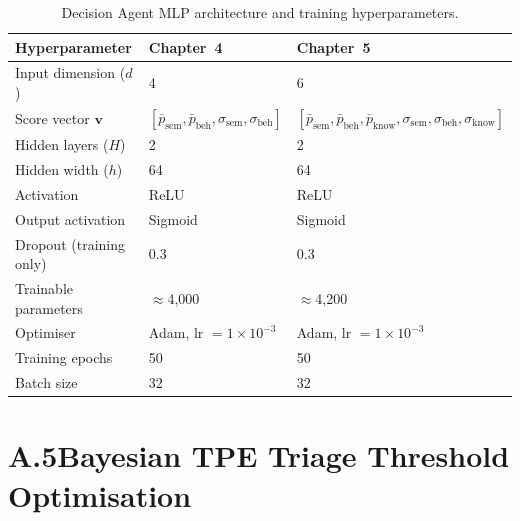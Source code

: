 \begin{table}[ht]
\centering
\caption{Decision Agent MLP architecture and training hyperparameters.}
\label{tab:app_mlp}
\begin{tabular}{@{}lll@{}}
\toprule
\textbf{Hyperparameter} & \textbf{Chapter~4} & \textbf{Chapter~5} \\
\midrule
Input dimension ($d$)         & 4  & 6  \\
Score vector $\mathbf{v}$     & $[\bar{p}_{\mathrm{sem}},\bar{p}_{\mathrm{beh}},\sigma_{\mathrm{sem}},\sigma_{\mathrm{beh}}]$ & $[\bar{p}_{\mathrm{sem}},\bar{p}_{\mathrm{beh}},\bar{p}_{\mathrm{know}},\sigma_{\mathrm{sem}},\sigma_{\mathrm{beh}},\sigma_{\mathrm{know}}]$ \\
Hidden layers ($H$)           & 2  & 2  \\
Hidden width ($h$)            & 64 & 64 \\
Activation                    & ReLU & ReLU \\
Output activation             & Sigmoid & Sigmoid \\
Dropout (training only)       & 0.3 & 0.3 \\
Trainable parameters          & $\approx$4,000 & $\approx$4,200 \\
Optimiser                     & Adam, lr $= 1\times10^{-3}$ & Adam, lr $= 1\times10^{-3}$ \\
Training epochs               & 50 & 50 \\
Batch size                    & 32 & 32 \\
\bottomrule
\end{tabular}
\end{table}

\section*{A.5\quad Bayesian TPE Triage Threshold Optimisation}

